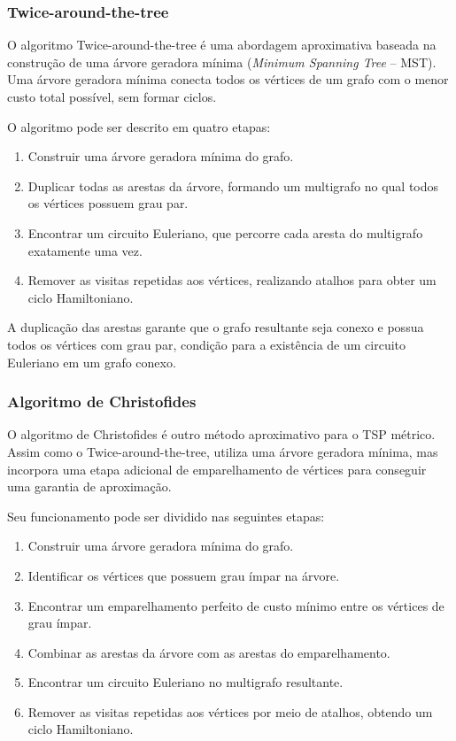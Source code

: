 \documentclass[12pt]{article}
\begin{document}
\subsubsection{Twice-around-the-tree}

O algoritmo Twice-around-the-tree é uma abordagem aproximativa baseada
na construção de uma árvore geradora mínima (\textit{Minimum Spanning
Tree} -- MST). Uma árvore geradora mínima conecta todos os vértices de
um grafo com o menor custo total possível, sem formar ciclos.

O algoritmo pode ser descrito em quatro etapas:

\begin{enumerate}
    \item Construir uma árvore geradora mínima do grafo.
    \item Duplicar todas as arestas da árvore, formando um multigrafo
    no qual todos os vértices possuem grau par.
    \item Encontrar um circuito Euleriano, que percorre cada aresta
    do multigrafo exatamente uma vez.
    \item Remover as visitas repetidas aos vértices, realizando atalhos
    para obter um ciclo Hamiltoniano.
\end{enumerate}

A duplicação das arestas garante que o grafo resultante seja conexo
e possua todos os vértices com grau par, condição  para a existência de um circuito Euleriano em um grafo
conexo.



\subsubsection{Algoritmo de Christofides}

O algoritmo de Christofides é outro método aproximativo para o TSP
métrico. Assim como o Twice-around-the-tree, utiliza uma árvore
geradora mínima, mas incorpora uma etapa adicional de emparelhamento
de vértices para conseguir  uma garantia de aproximação.

Seu funcionamento pode ser dividido nas seguintes etapas:

\begin{enumerate}
    \item Construir uma árvore geradora mínima do grafo.
    \item Identificar os vértices que possuem grau ímpar na árvore.
    \item Encontrar um emparelhamento perfeito de custo mínimo entre
    os vértices de grau ímpar.
    \item Combinar as arestas da árvore com as arestas do emparelhamento.
    \item Encontrar um circuito Euleriano no multigrafo resultante.
    \item Remover as visitas repetidas aos vértices por meio de atalhos,
    obtendo um ciclo Hamiltoniano.
\end{enumerate}
\end{document}

